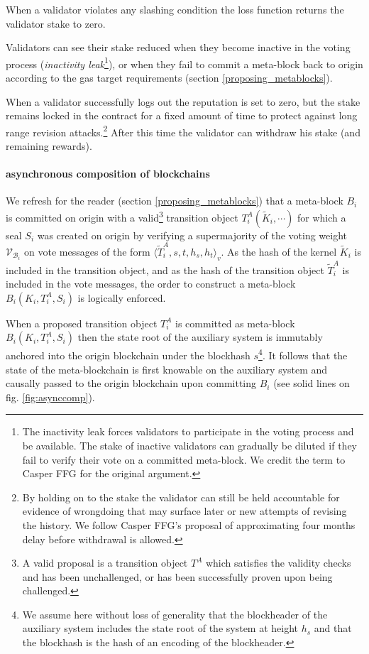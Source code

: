 \documentclass[12pt,a4paper]{article}
\begin{document}
When a validator violates any slashing condition the loss function returns the validator stake to zero.

Validators can see their stake reduced when they become inactive in the voting process (\emph{inactivity leak}\footnote{
  The inactivity leak forces validators to participate in the voting process and be available.
  The stake of inactive validators can gradually be diluted if they fail to verify their vote on a committed meta-block.
  We credit the term to Casper FFG\cite{casperffg} for the original argument.
}), or when they fail to commit a meta-block back to origin according to the gas target requirements (section  \ref{proposing_metablocks}).

When a validator successfully logs out the reputation is set to zero, but the stake remains locked in the contract for a fixed amount of time to protect against long range revision attacks.\footnote{
  By holding on to the stake the validator can still be held accountable for evidence of wrongdoing that may surface later or new attempts of revising the history.
  We follow Casper FFG's proposal of approximating four months delay before withdrawal is allowed.}
After this time the validator can withdraw his stake (and remaining rewards).

\paragraph{asynchronous composition of blockchains} We refresh for the reader (section \ref{proposing_metablocks}) that a meta-block $B_i$ is committed on origin with a valid\footnote{
  A valid proposal is a transition object $T^A$ which satisfies the validity checks and has been unchallenged, or has been successfully proven upon being challenged.
} transition object $T^A_i(\tilde{K}_i, \cdots)$ for which a seal $S_i$ was created on origin by verifying a supermajority of the voting weight $\mathcal{V}_{\mathcal{B}_i}$ on vote messages of the form $\langle \tilde{T}^A_i, s, t, h_s, h_t \rangle_v$.
As the hash of the kernel $\tilde{K}_i$ is included in the transition object, and as the hash of the transition object $\tilde{T}^A_i$ is included in the vote messages, the order to construct a meta-block $B_i(K_i, T^A_i, S_i)$ is logically enforced.

When a proposed transition object $T^A_i$ is committed as meta-block $B_i(K_i, T^A_i, S_i)$ then the state root of the auxiliary system is immutably anchored into the origin blockchain under the blockhash $s$\footnote{
  We assume here without loss of generality that the blockheader of the auxiliary system includes the state root of the system at height $h_s$ and that the blockhash is the hash of an encoding of the blockheader.}.
It follows that the state of the meta-blockchain is first knowable on the auxiliary system and causally passed to the origin blockchain upon committing $B_i$ (see solid lines on fig. \ref{fig:asynccomp}).
\end{document}
